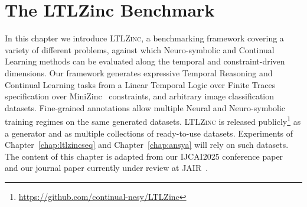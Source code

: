 \chapter{The LTLZinc Benchmark}
\label{chap:ltlzincbench}

In this chapter we introduce \textsc{LTLZinc}, a benchmarking framework covering a variety of different problems, against which Neuro-symbolic and Continual Learning methods can be evaluated along the temporal and constraint-driven dimensions. Our framework generates expressive Temporal Reasoning and Continual Learning tasks from a Linear Temporal Logic over Finite Traces specification over MiniZinc~\cite{nethercote2007minizinc} constraints, and arbitrary image classification datasets. Fine-grained annotations allow multiple Neural and Neuro-symbolic training regimes on the same generated datasets. \textsc{LTLZinc} is released publicly\footnote{\url{https://github.com/continual-nesy/LTLZinc}} as a generator and as multiple collections of ready-to-use datasets. Experiments of Chapter~\ref{chap:ltlzincseq} and Chapter~\ref{chap:ansya} will rely on such datasets. The content of this chapter is adapted from our IJCAI2025 conference paper~\cite{lorello2025neuro} and our journal paper currently under review at JAIR~\cite{lorello2025ltlzinc}.

